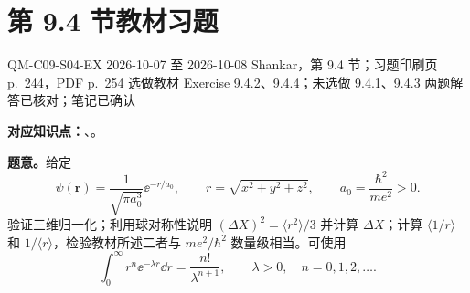 \section{第 9.4 节教材习题}
\label{exercise-set:QM-C09-S04}
\exercisemeta
  {QM-C09-S04-EX}
  {2026-10-07 至 2026-10-08}
  {Shankar，第 9.4 节；习题印刷页 p.~244，PDF p.~254}
  {选做教材 Exercise 9.4.2、9.4.4；未选做 9.4.1、9.4.3}
  {两题解答已核对；笔记已确认}

\textbf{对应知识点：}、。

\textbf{题意。}给定
\begin{equation}
  \psi(\mathbf r)=\frac1{\sqrt{\pi a_0^3}}\ee^{-r/a_0},
  \qquad r=\sqrt{x^2+y^2+z^2},\qquad a_0=\frac{\hbar^2}{me^2}>0.
\end{equation}
验证三维归一化；利用球对称性说明 $(\Delta X)^2=\langle r^2\rangle/3$ 并计算 $\Delta X$；计算 $\langle1/r\rangle$ 和 $1/\langle r\rangle$，检验教材所述二者与 $me^2/\hbar^2$ 数量级相当。可使用
\begin{equation}
  \int_0^\infty r^n\ee^{-\lambda r}\dd r
   =\frac{n!}{\lambda^{n+1}},\qquad
   \lambda>0,\quad n=0,1,2,\ldots.
\end{equation}

